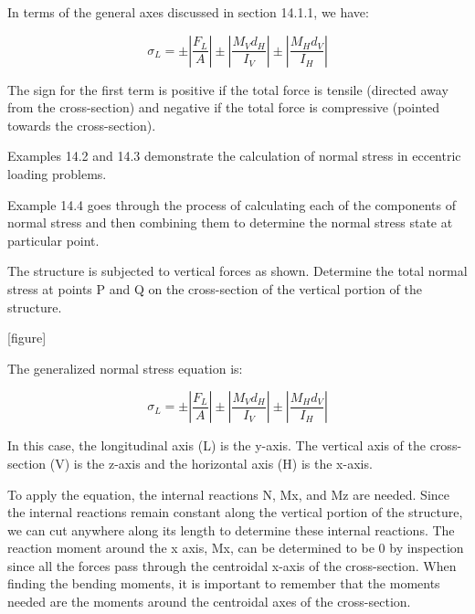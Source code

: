 \documentclass[
  letterpaper,
  DIV=11,
  numbers=noendperiod]{scrreprt}
\begin{document}
In terms of the general axes discussed in section 14.1.1, we have:

\[
\sigma_L= \pm\left|\frac{F_L}{A}\right| \pm\left|\frac{M_V d_H}{I_V}\right| \pm\left|\frac{M_H d_V}{I_H}\right|
\]

The sign for the first term is positive if the total force is tensile
(directed away from the cross-section) and negative if the total force
is compressive (pointed towards the cross-section).

Examples 14.2 and 14.3 demonstrate the calculation of normal stress in
eccentric loading problems.

Example 14.4 goes through the process of calculating each of the
components of normal stress and then combining them to determine the
normal stress state at particular point.

\begin{tcolorbox}[enhanced jigsaw, breakable, opacityback=0, toptitle=1mm, left=2mm, colback=white, opacitybacktitle=0.6, colframe=quarto-callout-note-color-frame, titlerule=0mm, arc=.35mm, leftrule=.75mm, bottomtitle=1mm, colbacktitle=quarto-callout-note-color!10!white, rightrule=.15mm, title={Example 14.2:}, bottomrule=.15mm, toprule=.15mm, coltitle=black]

The structure is subjected to vertical forces as shown. Determine the
total normal stress at points P and Q on the cross-section of the
vertical portion of the structure.

{[}figure{]}

\begin{tcolorbox}[enhanced jigsaw, breakable, opacityback=0, toptitle=1mm, left=2mm, colback=white, opacitybacktitle=0.6, colframe=quarto-callout-note-color-frame, titlerule=0mm, arc=.35mm, leftrule=.75mm, bottomtitle=1mm, colbacktitle=quarto-callout-note-color!10!white, rightrule=.15mm, title={Solution}, bottomrule=.15mm, toprule=.15mm, coltitle=black]

The generalized normal stress equation is:

\[
\sigma_L= \pm\left|\frac{F_L}{A}\right| \pm\left|\frac{M_V d_H}{I_V}\right| \pm\left|\frac{M_H d_V}{I_H}\right|
\]

In this case, the longitudinal axis (L) is the y-axis. The vertical axis
of the cross-section (V) is the z-axis and the horizontal axis (H) is
the x-axis.

To apply the equation, the internal reactions N, Mx, and Mz are needed.
Since the internal reactions remain constant along the vertical portion
of the structure, we can cut anywhere along its length to determine
these internal reactions. The reaction moment around the x axis, Mx, can
be determined to be 0 by inspection since all the forces pass through
the centroidal x-axis of the cross-section. When finding the bending
moments, it is important to remember that the moments needed are the
moments around the centroidal axes of the cross-section.


\end{tcolorbox}
\end{tcolorbox}
\end{document}
